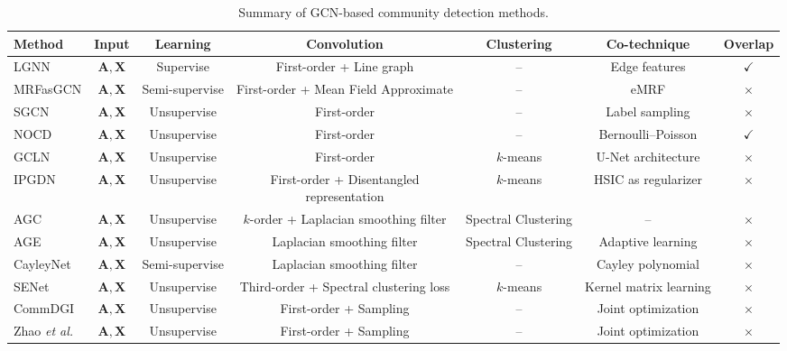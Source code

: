 \begin{table}[h]
\centering 
\footnotesize
\renewcommand\arraystretch{1.1}
\setlength{\tabcolsep}{2.5mm}
\caption{Summary of GCN-based community detection methods.}
\begin{tabular}{lcccccc}
\toprule[1 pt]
\textbf{Method} & \textbf{Input} & \textbf{Learning} & \textbf{Convolution} & \textbf{Clustering} & \textbf{Co-technique} & \textbf{Overlap} \\ 
\midrule
LGNN & $\bm{A},\bm{X}$ & Supervise & First-order + Line graph & -- & Edge features & $\checkmark$ \\ 
MRFasGCN & $\bm{A},\bm{X}$ & Semi-supervise & First-order + Mean Field Approximate & -- & eMRF & $\times$  \\
SGCN & $\bm{A},\bm{X}$ & Unsupervise & First-order & -- & Label sampling & $\times$ \\
NOCD & $\bm{A},\bm{X}$ & Unsupervise & First-order & -- & Bernoulli–Poisson & $\checkmark$ \\  
GCLN & $\bm{A},\bm{X}$ & Unsupervise & First-order & $k$-means & U-Net architecture & $\times$ \\  
IPGDN & $\bm{A},\bm{X}$ & Unsupervise & \makecell[c]{First-order + Disentangled\\ representation} & $k$-means & HSIC as regularizer & $\times$ \\
AGC & $\bm{A}, \bm{X}$ & Unsupervise & $k$-order + Laplacian smoothing filter & Spectral Clustering & -- & $\times$ \\  
AGE & $\bm{A},\bm{X}$ & Unsupervise & Laplacian smoothing filter & Spectral Clustering & Adaptive learning & $\times$ \\
CayleyNet & $\bm{A},\bm{X}$ & Semi-supervise & Laplacian smoothing filter & -- & Cayley polynomial & $\times$ \\ 
SENet & $\bm{A},\bm{X}$ & Unsupervise & Third-order + Spectral clustering loss & $k$-means & Kernel matrix learning & $\times$ \\
CommDGI & $\bm{A},\bm{X}$ & Unsupervise & First-order + Sampling & -- & Joint optimization & $\times$ \\
Zhao \textit{et al.} & $\bm{A},\bm{X}$ & Unsupervise & First-order + Sampling & -- & Joint optimization & $\times$ \\
\bottomrule[1 pt]
\end{tabular}
\label{table-gcn}
\end{table}

